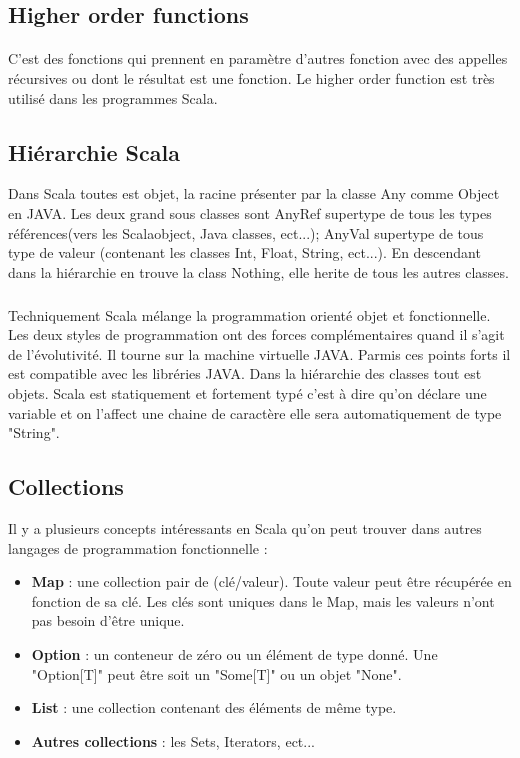 \subsection{Higher order functions}
\paragraph{}
C'est des fonctions qui prennent en paramètre d'autres fonction avec des appelles récursives ou dont le résultat est une fonction.
Le higher order function est très utilisé dans les programmes Scala.
\subsection{Hiérarchie Scala}
Dans Scala toutes est objet, la racine présenter par la classe Any comme Object en JAVA.
Les deux grand sous classes sont AnyRef supertype de tous les types références(vers les Scalaobject, Java classes, ect...);
AnyVal supertype de tous type de valeur (contenant les classes Int, Float, String, ect...).
En descendant dans la hiérarchie en trouve la class Nothing, elle herite de tous les autres classes.
\subparagraph{}
Techniquement Scala mélange la programmation orienté objet et fonctionnelle. Les deux styles de programmation ont des forces complémentaires quand il s'agit de l'évolutivité. Il tourne sur la machine virtuelle JAVA. Parmis ces points forts il est compatible avec les libréries JAVA.
Dans la hiérarchie des classes tout est objets.
Scala est statiquement et fortement typé c'est à dire qu'on déclare une variable et on l'affect une chaine de caractère elle sera automatiquement de type "String".
\subsection{Collections}
Il y a plusieurs concepts intéressants en Scala qu'on peut trouver dans autres langages de programmation fonctionnelle :
\begin{itemize}
\item \textbf{Map} : une collection pair de (clé/valeur). Toute valeur peut être récupérée en fonction de sa clé. Les clés sont uniques dans le Map, mais les valeurs n'ont pas besoin d'être unique.
\item \textbf{Option} : un conteneur de zéro ou un élément de type donné. Une "Option[T]" peut être soit un "Some[T]" ou un objet "None".
\item \textbf{List} : une collection contenant des éléments de même type. 
\item \textbf{Autres collections } : les Sets, Iterators, ect...
\end{itemize}
